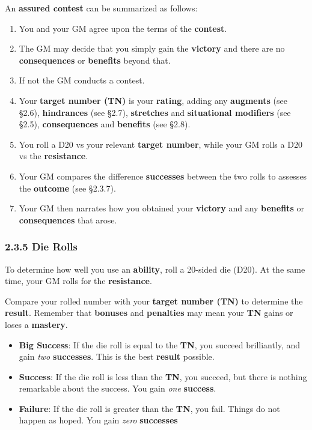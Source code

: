 \documentclass[
  11pt,
]{article}
\providecommand{\tightlist}{%
  \setlength{\itemsep}{0pt}\setlength{\parskip}{0pt}}
\begin{document}
An \textbf{assured contest} can be summarized as follows:

\begin{enumerate}
\def\labelenumi{\arabic{enumi}.}
\tightlist
\item
  You and your GM agree upon the terms of the \textbf{contest}.
\item
  The GM may decide that you simply gain the \textbf{victory} and there
  are no \textbf{consequences} or \textbf{benefits} beyond that.
\item
  If not the GM conducts a contest.
\item
  Your \textbf{target number (TN)} is your \textbf{rating}, adding any
  \textbf{augments} (see §2.6), \textbf{hindrances} (see §2.7),
  \textbf{stretches} and \textbf{situational modifiers} (see §2.5),
  \textbf{consequences} and \textbf{benefits} (see §2.8).
\item
  You roll a D20 vs your relevant \textbf{target number}, while your GM
  rolls a D20 vs the \textbf{resistance}.
\item
  Your GM compares the difference \textbf{successes} between the two
  rolls to assesses the \textbf{outcome} (see §2.3.7).
\item
  Your GM then narrates how you obtained your \textbf{victory} and any
  \textbf{benefits} or \textbf{consequences} that arose.
\end{enumerate}

\hypertarget{die-rolls}{%
\subsubsection{2.3.5 Die Rolls}\label{die-rolls}}

To determine how well you use an \textbf{ability}, roll a 20-sided die
(D20). At the same time, your GM rolls for the \textbf{resistance}.

Compare your rolled number with your \textbf{target number (TN)} to
determine the \textbf{result}. Remember that \textbf{bonuses} and
\textbf{penalties} may mean your \textbf{TN} gains or loses a
\textbf{mastery}.

\begin{itemize}
\tightlist
\item
  \textbf{Big Success}: If the die roll is equal to the \textbf{TN}, you
  succeed brilliantly, and gain \emph{two} \textbf{successes}. This is
  the best \textbf{result} possible.
\item
  \textbf{Success}: If the die roll is less than the \textbf{TN}, you
  succeed, but there is nothing remarkable about the success. You gain
  \emph{one} \textbf{success}.
\item
  \textbf{Failure}: If the die roll is greater than the \textbf{TN}, you
  fail. Things do not happen as hoped. You gain \emph{zero}
  \textbf{successes}
\end{itemize}
\end{document}
